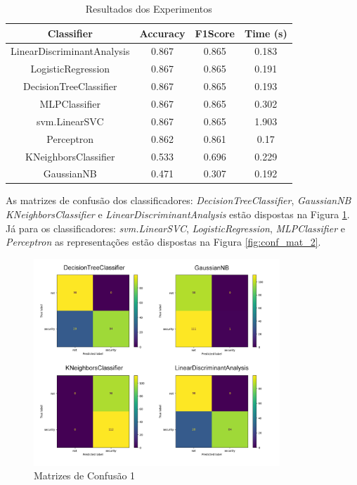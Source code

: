 \documentclass[conference]{IEEEtran}
\begin{document}
\begin{table}[!htb]
    \centering
    \begin{tabular}{|c|c|c|c|}
        \hline
        \textbf{Classifier}        & \textbf{Accuracy} & \textbf{F1Score} & \textbf{Time (s)} \\ \hline
        LinearDiscriminantAnalysis & 0.867             & 0.865            & 0.183             \\ \hline
        LogisticRegression         & 0.867             & 0.865            & 0.191             \\ \hline
        DecisionTreeClassifier     & 0.867             & 0.865            & 0.193             \\ \hline
        MLPClassifier              & 0.867             & 0.865            & 0.302             \\ \hline
        svm.LinearSVC              & 0.867             & 0.865            & 1.903             \\ \hline
        Perceptron                 & 0.862             & 0.861            & 0.17              \\ \hline
        KNeighborsClassifier       & 0.533             & 0.696            & 0.229             \\ \hline
        GaussianNB                 & 0.471             & 0.307            & 0.192             \\ \hline
    \end{tabular}
    \vspace{0.2cm}
    \caption{Resultados dos Experimentos}
    \label{tab:resultados_experimentos}
\end{table}

As matrizes de confusão dos classificadores: \textit{DecisionTreeClassifier}, \textit{GaussianNB} \textit{KNeighborsClassifier} e \textit{LinearDiscriminantAnalysis} estão dispostas na Figura \ref{fig:conf_mat_1}. Já para os classificadores: \textit{svm.LinearSVC}, \textit{LogisticRegression}, \textit{MLPClassifier} e \textit{Perceptron} as representações estão dispostas na Figura \ref{fig:conf_mat_2}.

\begin{figure}[htbp]
    \centerline{\includegraphics[width=25em]{images/conf_mat_1.png}}
    \caption{Matrizes de Confusão 1}
    \label{fig:conf_mat_1}
\end{figure}
\end{document}
